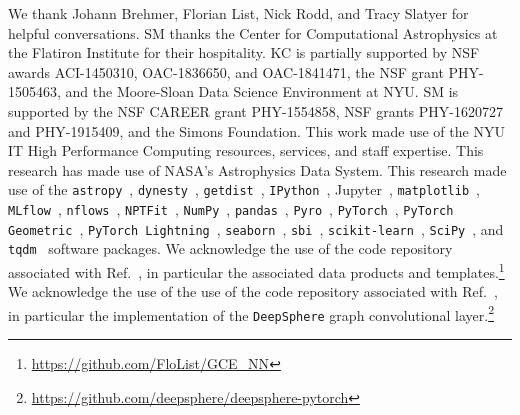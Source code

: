 \documentclass[prd,aps,10pt,nofootinbib,twocolumn,superscriptaddress,preprintnumbers,balancelastpage,longbibliography]{revtex4-1}
\begin{document}
\begin{acknowledgments}

We thank Johann Brehmer, Florian List, Nick Rodd, and Tracy Slatyer for helpful conversations. SM thanks the Center for Computational Astrophysics at the Flatiron Institute for their hospitality. KC is partially supported by NSF awards ACI-1450310, OAC-1836650, and OAC-1841471, the NSF grant PHY-1505463, and the Moore-Sloan Data Science Environment at NYU. 
SM is supported by the NSF CAREER grant PHY-1554858, NSF grants PHY-1620727 and PHY-1915409, and the Simons Foundation. 
This work made use of the NYU IT High Performance Computing resources, services, and staff expertise. 
This research has made use of NASA's Astrophysics Data System. 
This research made use of the \texttt{astropy}~\cite{Price-Whelan:2018hus,Robitaille:2013mpa}, \texttt{dynesty}~\cite{Speagle_2020}, \texttt{getdist}~\cite{Lewis:2019xzd}, \texttt{IPython}~\cite{PER-GRA:2007}, Jupyter~\cite{Kluyver2016JupyterN}, \texttt{matplotlib}~\cite{Hunter:2007}, \texttt{MLflow}~\cite{chen2020developments}, \texttt{nflows}~\cite{nflows}, \texttt{NPTFit}~\cite{Mishra-Sharma:2016gis}, \texttt{NumPy}~\cite{harris2020array}, \texttt{pandas}~\cite{pandas:2010}, \texttt{Pyro}~\cite{bingham2018pyro}, \texttt{PyTorch}~\cite{NEURIPS2019_9015}, \texttt{PyTorch Geometric}~\cite{Fey/Lenssen/2019}, \texttt{PyTorch Lightning}~\cite{william_falcon_2020_3828935}, \texttt{seaborn}~\cite{seaborn}, \texttt{sbi}~\cite{tejero-cantero2020sbi}, \texttt{scikit-learn}~\cite{scikit-learn}, \texttt{SciPy}~\cite{2020SciPy-NMeth}, and \texttt{tqdm}~\cite{da2019tqdm} software packages. We acknowledge the use of the code repository associated with Ref.~\cite{List:2020mzd}, in particular the associated data products and templates.\footnote{\url{https://github.com/FloList/GCE_NN}} We acknowledge the use of the use of the code repository associated with Ref.~\cite{defferrard2020deepsphere}, in particular the implementation of the \texttt{DeepSphere} graph convolutional layer.\footnote{\url{https://github.com/deepsphere/deepsphere-pytorch}}
\end{acknowledgments}





\end{document}
